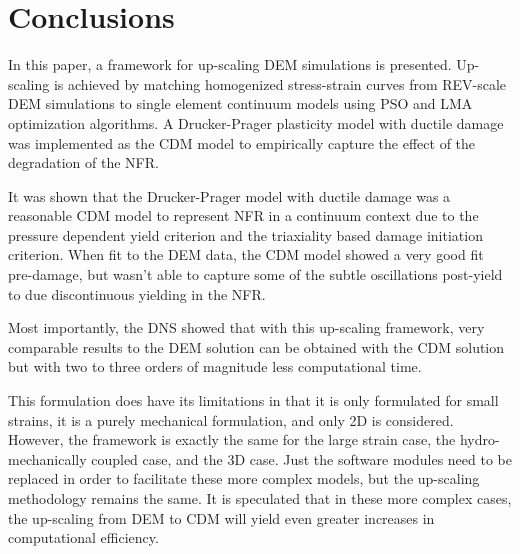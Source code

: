 \section{Conclusions}
In this paper, a framework for up-scaling DEM simulations is presented. Up-scaling is achieved by matching homogenized stress-strain curves from REV-scale DEM simulations to single element continuum models using PSO and LMA optimization algorithms. A Drucker-Prager plasticity model with ductile damage was implemented as the CDM model to empirically capture the effect of the degradation of the NFR.

It was shown that the Drucker-Prager model with ductile damage was a reasonable CDM model to represent NFR in a continuum context due to the pressure dependent yield criterion and the triaxiality based damage initiation criterion. When fit to the DEM data, the CDM model showed a very good fit pre-damage, but wasn't able to capture some of the subtle oscillations post-yield to due discontinuous yielding in the NFR.

Most importantly, the DNS showed that with this up-scaling framework, very comparable results to the DEM solution can be obtained with the CDM solution but with two to three orders of magnitude less computational time.

This formulation does have its limitations in that it is only formulated for small strains, it is a purely mechanical formulation, and only 2D is considered. However, the framework is exactly the same for the large strain case, the hydro-mechanically coupled case, and the 3D case. Just the software modules need to be replaced in order to facilitate these more complex models, but the up-scaling methodology remains the same. It is speculated that in these more complex cases, the up-scaling from DEM to CDM will yield even greater increases in computational efficiency. 











\clearpage